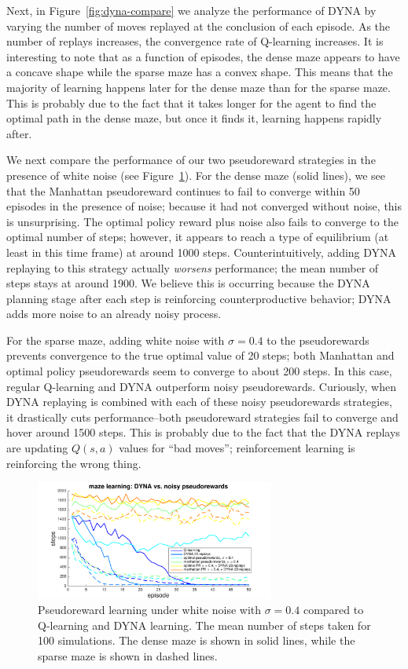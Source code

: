 \documentclass[notitlepage]{article}
\begin{document}
Next, in Figure~\ref{fig:dyna-compare} we analyze the performance of DYNA by varying the number of moves replayed at the conclusion of each episode. As the number of replays increases, the convergence rate of Q-learning increases. It is interesting to note that as a function of episodes, the dense maze appears to have a concave shape while the sparse maze has a convex shape. This means that the majority of learning happens later for the dense maze than for the sparse maze. This is probably due to the fact that it takes longer for the agent to find the optimal path in the dense maze, but once it finds it, learning happens rapidly after. 

We next compare the performance of our two pseudoreward strategies in the presence of white noise (see Figure~\ref{fig:model-compare-noise}). For the dense maze (solid lines), we see that the Manhattan pseudoreward continues to fail to converge within 50 episodes in the presence of noise; because it had not converged without noise, this is unsurprising. The optimal policy reward plus noise also fails to converge to the optimal number of steps; however, it appears to reach a type of equilibrium (at least in this time frame) at around 1000 steps. Counterintuitively, adding DYNA replaying to this strategy actually \textit{worsens} performance; the mean number of steps stays at around 1900. We believe this is occurring because the DYNA planning stage after each step is reinforcing counterproductive behavior; DYNA adds more noise to an already noisy process.

For the sparse maze, adding white noise with $\sigma = 0.4$ to the pseudorewards prevents convergence to the true optimal value of 20 steps; both Manhattan and optimal policy pseudorewards seem to converge to about 200 steps. In this case, regular Q-learning and DYNA outperform noisy pseudorewards. Curiously, when DYNA replaying is combined with each of these noisy pseudorewards strategies, it drastically cuts performance--both pseudoreward strategies fail to converge and hover around 1500 steps. This is probably due to the fact that the DYNA replays are updating $Q(s,a)$ values for ``bad moves''; reinforcement learning is reinforcing the wrong thing.

\begin{figure}[ht]
\centering
\includegraphics[width=0.7\textwidth]{modelCompareHighNoise}
\caption{Pseudoreward learning under white noise with $\sigma = 0.4$ compared to Q-learning and DYNA learning. The mean number of steps taken for 100 simulations. The dense maze is shown in solid lines, while the sparse maze is shown in dashed lines.}
\label{fig:model-compare-noise}
\end{figure}
\end{document}
